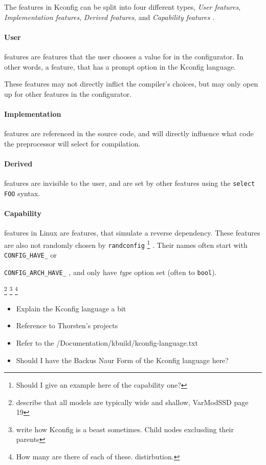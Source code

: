 \documentclass[a4paper,11pt]{report}
\newcommand{\textcode}[1]{
    \fboxsep=1pt
    \texttt{\colorbox{gray!20}{#1}}
}
\begin{document}
        {\color{gray}
The features in Kconfig can be split into four different types, \emph{User 
features}, \emph{Implementation features}, \emph{Derived features}, and 
\emph{Capability features}
    \cite[p. 8]{VarModSSD}
.
\\ 

\paragraph{User} features are features that the user chooses a value for in the 
configurator. In other words, a feature, that has a prompt option in the 
Kconfig language. 

These features may not directly inflict the compiler's choices, but may only 
open up for other features in the configurator.

\paragraph{Implementation} features are referenced in the source code, and will 
directly influence what code the preprocessor will select for compilation.

\paragraph{Derived} features are invisible to the user, and are set by other 
features using the \textcode{select FOO} syntax.

\paragraph{Capability} features in Linux are features, that simulate a reverse 
dependency. These features are also not randomly chosen by 
    \texttt{randconfig}
        \footnote{Should I give an example here of the capability one?}
    . Their names often start with \textcode{CONFIG\_HAVE\_} or 
    \textcode{CONFIG\_ARCH\_HAVE\_}, and only have \emph{type} option set (often to 
    \texttt{bool}).
            } %

        \footnote{describe that all models are typically wide and shallow, 
        VarModSSD page 19}
        \footnote{write how Kconfig is a beast sometimes. Child nodes exclusding 
        their parents}
        \footnote{How many are there of each of these. distirbution.}


\begin{itemize}
    \item Explain the Kconfig language a bit
    \item Reference to Thorsten's projects
    \item Refer to the /Documentation/kbuild/kconfig-language.txt
    \item Should I have the Backus Naur Form of the Kconfig language here?
\end{itemize}
\end{document}
